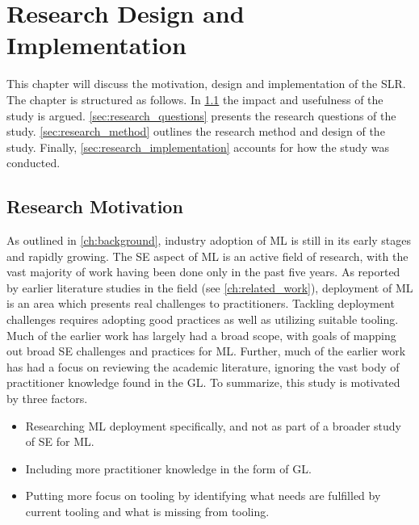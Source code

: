 \chapter{Research Design and Implementation}
\label{ch:research_design_and_implementation}
This chapter will discuss the motivation, design and implementation of the SLR.
The chapter is structured as follows.
In \cref{sec:research_motivation} the impact and usefulness of the study is argued.
\cref{sec:research_questions} presents the research questions of the study.
\cref{sec:research_method} outlines the research method and design of the study.
Finally, \cref{sec:research_implementation} accounts for how the study was conducted.

\section{Research Motivation}
\label{sec:research_motivation}
As outlined in \cref{ch:background}, industry adoption of ML is still in its early stages and rapidly growing.
The SE aspect of ML is an active field of research, with the vast majority of work having been done only in the past five years.
As reported by earlier literature studies in the field (see \cref{ch:related_work}), deployment of ML is an area which presents real challenges to practitioners.
Tackling deployment challenges requires adopting good practices as well as utilizing suitable tooling.
Much of the earlier work has largely had a broad scope, with goals of mapping out broad SE challenges and practices for ML.
Further, much of the earlier work has had a focus on reviewing the academic literature, ignoring the vast body of practitioner knowledge found in the GL.
To summarize, this study is motivated by three factors.
\begin{itemize}
    \item Researching ML deployment specifically, and not as part of a broader study of SE for ML.
    \item Including more practitioner knowledge in the form of GL.
    \item Putting more focus on tooling by identifying what needs are fulfilled by current tooling and what is missing from tooling.
\end{itemize}

